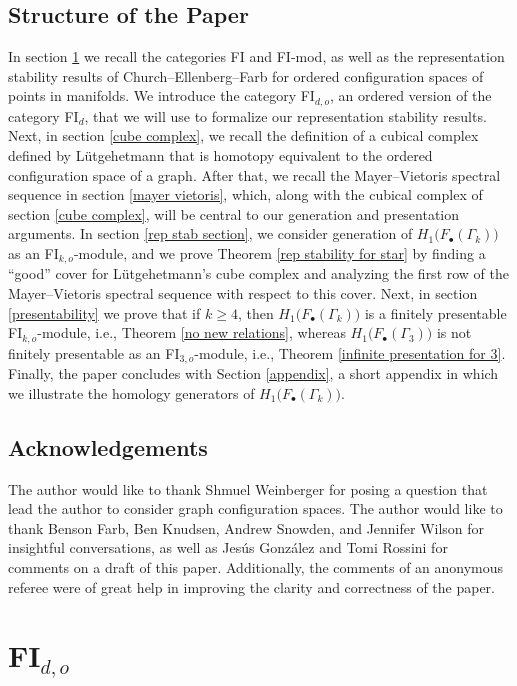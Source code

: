 \documentclass[pagebackref,colorlinks,citecolor=blue,linkcolor=blue,urlcolor=blue,filecolor=blue]{article}
\theoremstyle{definition}\newtheorem{definition}[thm]{Definition}
\theoremstyle{definition}
\begin{document}
\subsection{Structure of the Paper}
In section \ref{FIOk} we recall the categories FI and FI-mod, as well as the representation stability results of Church--Ellenberg--Farb for ordered configuration spaces of points in manifolds.
We introduce the category FI$_{d,o}$, an ordered version of the category FI$_{d}$, that we will use to formalize our representation stability results.
Next, in section \ref{cube complex}, we recall the definition of a cubical complex defined by L\"{u}tgehetmann that is homotopy equivalent to the ordered configuration space of a graph.
After that, we recall the Mayer--Vietoris spectral sequence in section \ref{mayer vietoris}, which, along with the cubical complex of section \ref{cube complex}, will be central to our generation and presentation arguments.
In section \ref{rep stab section}, we consider generation of $H_{1}\big(F_{\bullet}(\Gamma_{k})\big)$ as an FI$_{k, o}$-module, and we prove Theorem \ref{rep stability for star} by finding a ``good'' cover for L\"{u}tgehetmann's cube complex and analyzing the first row of the Mayer--Vietoris spectral sequence with respect to this cover.
Next, in section \ref{presentability} we prove that if $k\ge 4$, then $H_{1}\big(F_{\bullet}(\Gamma_{k})\big)$ is a finitely presentable FI$_{k,o}$-module, i.e., Theorem \ref{no new relations}, whereas $H_{1}\big(F_{\bullet}(\Gamma_{3})\big)$ is not finitely presentable as an FI$_{3, o}$-module, i.e., Theorem \ref{infinite presentation for 3}.
Finally, the paper concludes with Section \ref{appendix}, a short appendix in which we illustrate the homology generators of $H_{1}\big(F_{\bullet}(\Gamma_{k})\big)$.\\

\subsection{Acknowledgements}
The author would like to thank Shmuel Weinberger for posing a question that lead the author to consider graph configuration spaces.
The author would like to thank Benson Farb, Ben Knudsen, Andrew Snowden, and Jennifer Wilson for insightful conversations, as well as Jes\'{u}s Gonz\'{a}lez and Tomi Rossini for comments on a draft of this paper. 
Additionally, the comments of an anonymous referee were of great help in improving the clarity and correctness of the paper.

\section{FI$_{d,o}$}\label{FIOk}
\end{document}
